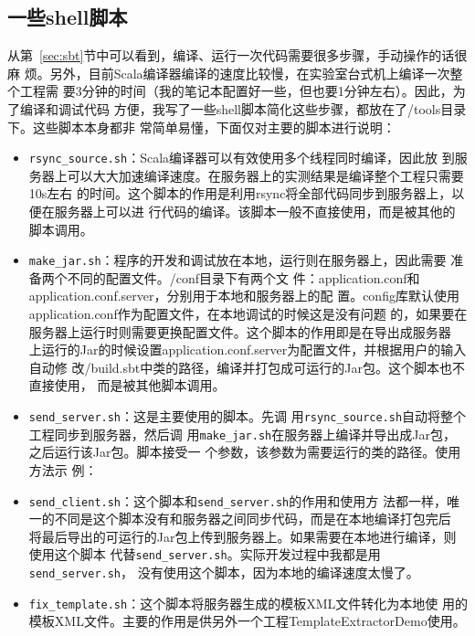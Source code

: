 \documentclass{article}
\begin{document}
\subsection{一些shell脚本}
从第~\ref{sec:sbt}节中可以看到，编译、运行一次代码需要很多步骤，手动操作的话很麻
烦。另外，目前Scala编译器编译的速度比较慢，在实验室台式机上编译一次整个工程需
要3分钟的时间（我的笔记本配置好一些，但也要1分钟左右）。因此，为了编译和调试代码
方便，我写了一些shell脚本简化这些步骤，都放在了\prj/tools目录下。这些脚本本身都非
常简单易懂，下面仅对主要的脚本进行说明：
\begin{itemize}
\item \texttt{rsync\_source.sh}：Scala编译器可以有效使用多个线程同时编译，因此放
  到服务器上可以大大加速编译速度。在服务器上的实测结果是编译整个工程只需要10s左右
  的时间。这个脚本的作用是利用rsync将全部代码同步到服务器上，以便在服务器上可以进
  行代码的编译。该脚本一般不直接使用，而是被其他的脚本调用。
\item \texttt{make\_jar.sh}：程序的开发和调试放在本地，运行则在服务器上，因此需要
  准备两个不同的配置文件。\prj/conf目录下有两个文
  件：application.conf和application.conf.server，分别用于本地和服务器上的配
  置。config库默认使用application.conf作为配置文件，在本地调试的时候这是没有问题
  的，如果要在服务器上运行时则需要更换配置文件。这个脚本的作用即是在导出成服务器
  上运行的Jar的时候设置application.conf.server为配置文件，并根据用户的输入自动修
  改\prj/build.sbt中类的路径，编译并打包成可运行的Jar包。这个脚本也不直接使用，
  而是被其他脚本调用。
\item \texttt{send\_server.sh}：这是主要使用的脚本。先调
  用\texttt{rsync\_source.sh}自动将整个工程同步到服务器，然后调
  用\texttt{make\_jar.sh}在服务器上编译并导出成Jar包，之后运行该Jar包。脚本接受一
  个参数，该参数为需要运行的类的路径。使用方法示
  例：\\
\item \texttt{send\_client.sh}：这个脚本和\texttt{send\_server.sh}的作用和使用方
  法都一样，唯一的不同是这个脚本没有和服务器之间同步代码，而是在本地编译打包完后
  将最后导出的可运行的Jar包上传到服务器上。如果需要在本地进行编译，则使用这个脚本
  代替\texttt{send\_server.sh}。实际开发过程中我都是用\texttt{send\_server.sh}，
  没有使用这个脚本，因为本地的编译速度太慢了。
\item  \texttt{fix\_template.sh}：这个脚本将服务器生成的模板XML文件转化为本地使
  用的模板XML文件。主要的作用是供另外一个工程TemplateExtractorDemo使用。
\end{itemize}
\end{document}
